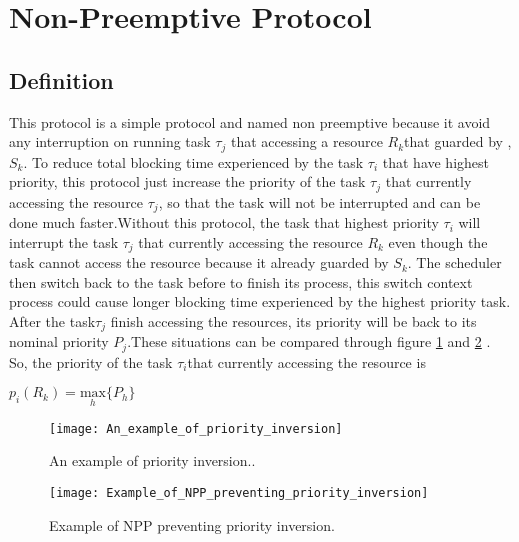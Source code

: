 \section{Non-Preemptive Protocol}

\subsection{Definition}

This protocol is a simple protocol and named non preemptive because it avoid any interruption on running task $\tau_{j}$ that accessing a resource $ R_{k} $that guarded by , $ S_{k} $. To reduce total blocking time experienced by the task $\tau_{i}$ that have highest priority, this protocol just increase the priority of the task $\tau_{j}$ that currently accessing the resource $\tau_{j}$, so that the task will not be interrupted and can be done much faster.Without this protocol, the task that highest priority $\tau_{i}$ will interrupt the task $\tau_{j}$ that currently accessing the resource $ R_{k} $ even though the task cannot access the resource because it already guarded by $ S_{k} $. The scheduler then switch back to the task before to finish its process, this switch context process could cause longer blocking time experienced by the highest priority task. After the task$\tau_{j}$ finish accessing the resources, its priority will be back to its nominal priority $ P_{j} $.These situations can be compared through figure \ref{fig:An_example_of_priority_inversion} and \ref{fig:Example_of_NPP_preventing_priority_inversion} . So, the priority of the task $\tau_{i}$that currently accessing the resource is 

\begin{center}
$p_{i}(R_{k})=\underset{h}{\mathrm{max}} \{P_{h}\}  $

\end{center}

\begin{figure}[h]
    \centering
    \texttt{[image: An\_example\_of\_priority\_inversion]}
    \caption{An example of priority inversion.. \cite{b5}}
    \label{fig:An_example_of_priority_inversion}
\end{figure}

\begin{figure}[h]
    \centering
    \texttt{[image: Example\_of\_NPP\_preventing\_priority\_inversion]}
    \caption{Example of NPP preventing priority inversion. \cite{b5}}
    \label{fig:Example_of_NPP_preventing_priority_inversion}
\end{figure}


